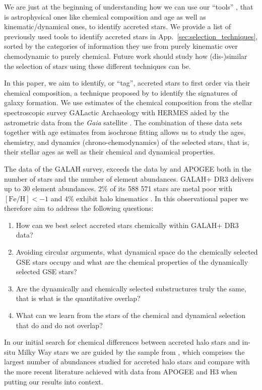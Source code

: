 \documentclass[fleqn,usenatbib]{mnras}
\newcommand{\Gaia}{\textit{Gaia}\xspace} %
\begin{document}
We are just at the beginning of understanding how we can use our ``tools'' \citep{Helmi2020}, that is astrophysical ones like chemical composition and age as well as kinematic/dynamical ones, to identify accreted stars. We provide a list of previously used tools to identify accreted stars in App.~\ref{sec:selection_techniques}, sorted by the categories of information they use from purely kinematic over chemodynamic to purely chemical. Future work should study how (dis-)similar the selection of stars using these different techniques can be.

In this paper, we aim to identify, or ``tag'', accreted stars to first order via their chemical composition, a technique proposed by \citet{FreemanBlandHawthorn2002} to identify the signatures of galaxy formation. We use estimates of the chemical composition from the stellar spectroscopic survey GALactic Archaeology with HERMES \citep[GALAH, ][]{DeSilva2015, Buder2021} aided by the astrometric data from the \Gaia satellite \citep{Brown2021}. The combination of these data sets together with age estimates from isochrone fitting allows us to study the ages, chemistry, and dynamics (chrono-chemodynamics) of the selected stars, that is, their stellar ages as well as their chemical and dynamical properties.

The data of the GALAH survey, exceeds the data by \citet{Nissen2010} and APOGEE both in the number of stars and the number of element abundances. GALAH+ DR3 delivers up to 30 element abundances. 2\% of its 588 571 stars are metal poor with $\mathrm{[Fe/H]} < -1$ and 4\% exhibit halo kinematics \citep{Buder2021}. In this observational paper we therefore aim to address the following questions:
\begin{enumerate}
\item How can we best select accreted stars chemically within GALAH+ DR3 data?
\item Avoiding circular arguments, what dynamical space do the chemically selected GSE stars occupy and what are the chemical properties of the dynamically selected GSE stars?
\item Are the dynamically and chemically selected substructures truly the same, that is what is the quantitative overlap?
\item What can we learn from the stars of the chemical and dynamical selection that do and do not overlap?
\end{enumerate}

In our initial search for chemical differences between accreted halo stars and in-situ Milky Way stars we are guided by the sample from \citet{Nissen2010}, which comprises the largest number of abundances studied for accreted halo stars and compare with the more recent literature achieved with data from APOGEE and H3 when putting our results into context.
\end{document}
